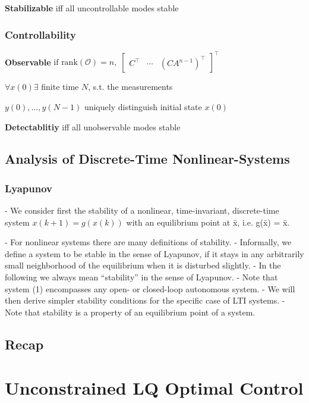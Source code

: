 \textbf{Stabilizable} iff all uncontrollable modes stable

\subsubsection{Controllability}
\textbf{Observable}
$
	\text{if rank}(\mathcal{O}) = n
	,\;
	\begin{bmatrix}
		C^\top & \cdots & (CA^{n-1})^\top
	\end{bmatrix}^\top
$

$\forall x(0)\exists$ finite time $N$, s.t. the measurements

$y(0), \dots, y(N-1)$
uniquely distinguish initial state $x(0)$

\textbf{Detectablitiy} iff all unobservable modes stable


\subsection{Analysis of Discrete-Time Nonlinear-Systems}

\subsubsection{Lyapunov}

- We consider first the stability of a nonlinear,
time-invariant, discrete-time system
$x(k +1) = g(x(k))$
with an equilibrium point at x̄, i.e. g(x̄) = x̄.

- For nonlinear systems there are many definitions of stability.
- Informally, we define a system to be stable in the sense of Lyapunov, if it
stays in any arbitrarily small neighborhood of the equilibrium when it is
disturbed slightly.
- In the following we always mean “stability” in the sense of Lyapunov.
- Note that system (1) encompasses any open- or closed-loop autonomous
system.
- We will then derive simpler stability conditions for the specific case of LTI
systems.
- Note that stability is a property of an equilibrium point of a system.


\subsection{Recap}

\section{Unconstrained LQ Optimal Control}

